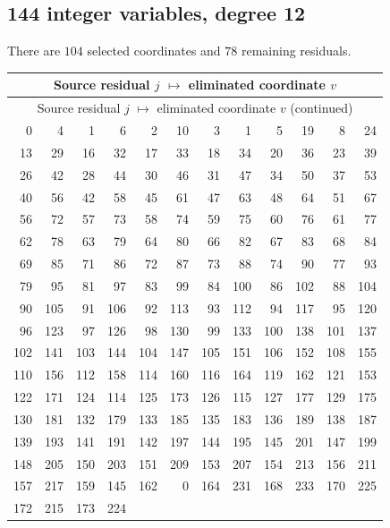 \subsection{144 integer variables, degree 12}
There are $104$ selected coordinates and $78$ remaining residuals.
\begingroup
\small
\setlength{\tabcolsep}{4pt}
\begin{longtable}{*{6}{r@{\,$\mapsto$\,}r}}
\hline
\multicolumn{12}{c}{Source residual $j$ $\mapsto$ eliminated coordinate $v$}\\
\hline
\endfirsthead
\hline
\multicolumn{12}{c}{Source residual $j$ $\mapsto$ eliminated coordinate $v$ (continued)}\\
\hline
\endhead
0 & 4 & 1 & 6 & 2 & 10 & 3 & 1 & 5 & 19 & 8 & 24 \\
13 & 29 & 16 & 32 & 17 & 33 & 18 & 34 & 20 & 36 & 23 & 39 \\
26 & 42 & 28 & 44 & 30 & 46 & 31 & 47 & 34 & 50 & 37 & 53 \\
40 & 56 & 42 & 58 & 45 & 61 & 47 & 63 & 48 & 64 & 51 & 67 \\
56 & 72 & 57 & 73 & 58 & 74 & 59 & 75 & 60 & 76 & 61 & 77 \\
62 & 78 & 63 & 79 & 64 & 80 & 66 & 82 & 67 & 83 & 68 & 84 \\
69 & 85 & 71 & 86 & 72 & 87 & 73 & 88 & 74 & 90 & 77 & 93 \\
79 & 95 & 81 & 97 & 83 & 99 & 84 & 100 & 86 & 102 & 88 & 104 \\
90 & 105 & 91 & 106 & 92 & 113 & 93 & 112 & 94 & 117 & 95 & 120 \\
96 & 123 & 97 & 126 & 98 & 130 & 99 & 133 & 100 & 138 & 101 & 137 \\
102 & 141 & 103 & 144 & 104 & 147 & 105 & 151 & 106 & 152 & 108 & 155 \\
110 & 156 & 112 & 158 & 114 & 160 & 116 & 164 & 119 & 162 & 121 & 153 \\
122 & 171 & 124 & 114 & 125 & 173 & 126 & 115 & 127 & 177 & 129 & 175 \\
130 & 181 & 132 & 179 & 133 & 185 & 135 & 183 & 136 & 189 & 138 & 187 \\
139 & 193 & 141 & 191 & 142 & 197 & 144 & 195 & 145 & 201 & 147 & 199 \\
148 & 205 & 150 & 203 & 151 & 209 & 153 & 207 & 154 & 213 & 156 & 211 \\
157 & 217 & 159 & 145 & 162 & 0 & 164 & 231 & 168 & 233 & 170 & 225 \\
172 & 215 & 173 & 224 & \multicolumn{2}{c}{} & \multicolumn{2}{c}{} & \multicolumn{2}{c}{} & \multicolumn{2}{c}{} \\
\hline
\end{longtable}
\endgroup

